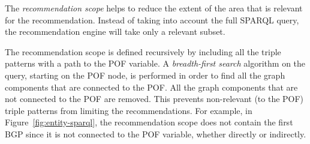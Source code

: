 The \emph{recommendation scope} helps to reduce the extent of the area that is relevant for the recommendation. Instead of taking into account the full SPARQL query, the recommendation engine will take only a relevant subset.

The recommendation scope is defined recursively by including all the triple patterns with a path to the POF variable. A \emph{breadth-first search} algorithm on the query, starting on the POF node, is performed in order to find all the graph components that are connected to the POF. All the graph components that are not connected to the POF are removed. This prevents non-relevant (to the POF) triple patterns from limiting the recommendations. For example, in Figure~\ref{fig:entity-sparql}, the recommendation scope does not contain the first BGP since it is not connected to the POF variable, whether directly or indirectly.






